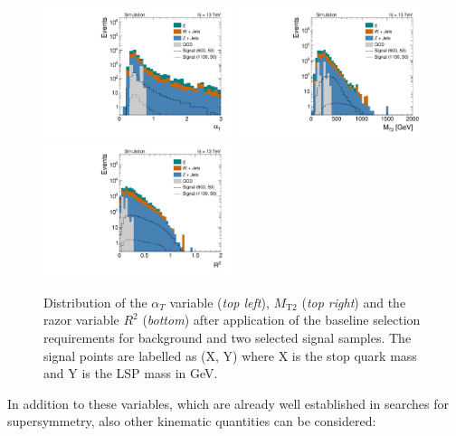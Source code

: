 \begin{figure}[!t]
  \centering
  \begin{minipage}[c]{1.\textwidth}
    \begin{center}
      \includegraphics[width=0.49\textwidth]{figures/Stop_DeltaPhiSelection_AlphaT.pdf}  
      \includegraphics[width=0.49\textwidth]{figures/Stop_DeltaPhiSelection_MT2.pdf} \\
      \includegraphics[width=0.49\textwidth]{figures/Stop_DeltaPhiSelection_Razor_R.pdf}
    \end{center}
  \end{minipage}

  \caption{Distribution of the $\alpha_T$ variable (\textit{top left}), $M_\mathrm{T2}$ (\textit{top right}) and  the razor variable $R^2$ (\textit{bottom}) after application of the baseline selection requirements for background and two selected signal samples. The signal points are labelled as (X, Y) where X is the stop quark mass and Y is the LSP mass in GeV.}
  \label{fig:stop_baseline_kin_vars}
\end{figure}
In addition to these variables, which are already well established in searches for supersymmetry, also other kinematic quantities can be considered:
